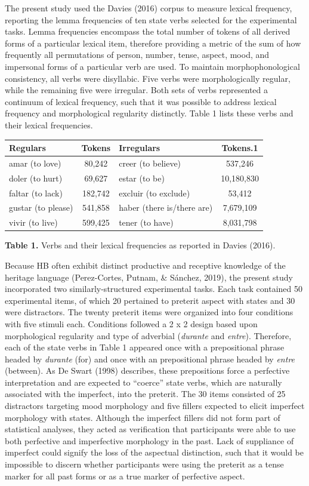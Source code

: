 \documentclass[
  english,
  man]{apa6}
\begin{document}
The present study used the Davies (2016) corpus to measure lexical frequency, reporting the lemma frequencies of ten state verbs selected for the experimental tasks. Lemma frequencies encompass the total number of tokens of all derived forms of a particular lexical item, therefore providing a metric of the sum of how frequently all permutations of person, number, tense, aspect, mood, and impersonal forms of a particular verb are used. To maintain morphophonological consistency, all verbs were disyllabic. Five verbs were morphologically regular, while the remaining five were irregular. Both sets of verbs represented a continuum of lexical frequency, such that it was possible to address lexical frequency and morphological regularity distinctly. Table 1 lists these verbs and their lexical frequencies.

\begin{tabular}{l|c|l|c}
\hline
Regulars & Tokens & Irregulars & Tokens.1\\
\hline
amar (to love) & 80,242 & creer (to believe) & 537,246\\
\hline
doler (to hurt) & 69,627 & estar (to be) & 10,180,830\\
\hline
faltar (to lack) & 182,742 & excluir (to exclude) & 53,412\\
\hline
gustar (to please) & 541,858 & haber (there is/there are) & 7,679,109\\
\hline
vivir (to live) & 599,425 & tener (to have) & 8,031,798\\
\hline
\end{tabular}

\textbf{Table 1.} Verbs and their lexical frequencies as reported in Davies (2016).

Because HB often exhibit distinct productive and receptive knowledge of the heritage language (Perez-Cortes, Putnam, \& Sánchez, 2019), the present study incorporated two similarly-structured experimental tasks. Each task contained 50 experimental items, of which 20 pertained to preterit aspect with states and 30 were distractors. The twenty preterit items were organized into four conditions with five stimuli each. Conditions followed a 2 x 2 design based upon morphological regularity and type of adverbial (\emph{durante} and \emph{entre}). Therefore, each of the state verbs in Table 1 appeared once with a prepositional phrase headed by \emph{durante} (for) and once with an prepositional phrase headed by \emph{entre} (between). As De Swart (1998) describes, these prepositions force a perfective interpretation and are expected to ``coerce'' state verbs, which are naturally associated with the imperfect, into the preterit. The 30 items consisted of 25 distractors targeting mood morphology and five fillers expected to elicit imperfect morphology with states. Although the imperfect fillers did not form part of statistical analyses, they acted as verification that participants were able to use both perfective and imperfective morphology in the past. Lack of suppliance of imperfect could signify the loss of the aspectual distinction, such that it would be impossible to discern whether participants were using the preterit as a tense marker for all past forms or as a true marker of perfective aspect.
\end{document}
